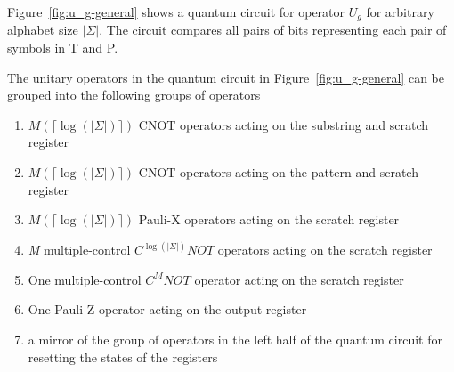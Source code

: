 Figure~\ref{fig:u_g-general} shows a quantum circuit for operator $U_g$ for arbitrary alphabet size $\vert \Sigma \vert$. The circuit compares all pairs of bits representing each pair of symbols in T and P. 

The unitary operators in the quantum circuit in Figure~\ref{fig:u_g-general} can be grouped into the following groups of operators
\begin{enumerate}
	\item $M(\lceil\log(\vert\Sigma\vert)\rceil)$ CNOT operators acting on the substring and scratch register
	\item $M(\lceil\log(\vert\Sigma\vert)\rceil)$ CNOT operators acting on the pattern and scratch register
	\item $M(\lceil\log(\vert\Sigma\vert)\rceil)$ Pauli-X operators acting on the scratch register
	\item \textit{M} multiple-control $C^{\log(\vert\Sigma\vert)}NOT$ operators acting on the scratch register
	\item One multiple-control $C^{M}NOT$ operator acting on the scratch register
	\item One Pauli-Z operator acting on the output register
	\item a mirror of the group of operators in the left half of the quantum circuit for resetting the states of the registers
\end{enumerate}

